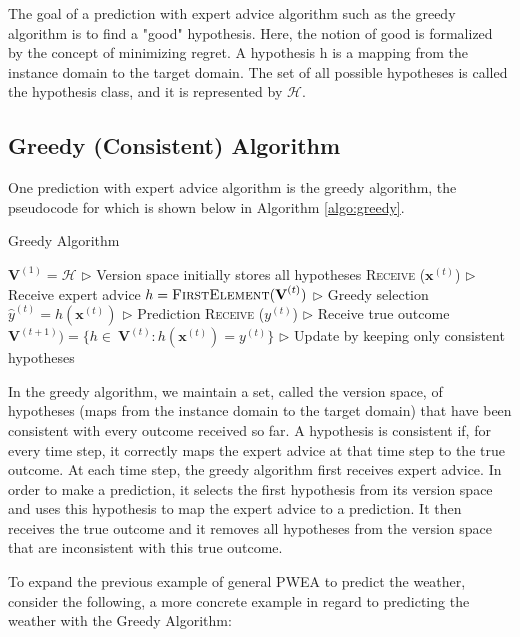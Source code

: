 \documentclass[11pt]{article}
\begin{document}
The goal of a prediction with expert advice algorithm such as the greedy algorithm is to find a "good" hypothesis. Here, the notion of good is formalized by the concept of minimizing regret. A hypothesis h is a mapping from the instance domain to the target domain. The set of all possible hypotheses is called the hypothesis class, and it is represented by $\mathcal{H}$.

\subsection{Greedy (Consistent) Algorithm }
\normalfont
One prediction with expert advice algorithm is the greedy algorithm, the pseudocode for which is shown below in Algorithm \ref{algo:greedy}. 

\begin{algorithm}[H]
\caption{Greedy Algorithm}
\label{algo:greedy}
\begin{algorithmic}[1]
\STATE $\textbf{V}^{(1)} = \mathcal{H}$ \hfill $\triangleright$ Version space initially stores all hypotheses
\STATE \textsc{Receive} ($\textbf{x}^{(t)}$) \hfill $\triangleright$ Receive expert advice
\STATE $h = \textsc{FirstElement}(\textbf{V}^{(t)})$ \hfill $\triangleright$ Greedy selection
\STATE $\hat{y}^{(t)} = h(\textbf{x}^{(t)})$ \hfill $\triangleright$ Prediction
\STATE \textsc{Receive} ($y^{(t)}$) \hfill $\triangleright$ Receive true outcome
\STATE $\textbf{V}^{(t+1)}) = \{h \in\ \textbf{V}^{(t)} : h(\textbf{x}^{(t)}) = y^{(t)}\}$ \hfill $\triangleright$ Update by keeping only consistent hypotheses

\ENDFOR
\end{algorithmic}
\end{algorithm}

In the greedy algorithm, we maintain a set, called the version space, of hypotheses (maps from the instance domain to the target domain) that have been consistent with every outcome received so far. A hypothesis is consistent if, for every time step, it correctly maps the expert advice at that time step to the true outcome. At each time step, the greedy algorithm first receives expert advice. In order to make a prediction, it selects the first hypothesis from its version space and uses this hypothesis to map the expert advice to a prediction. It then receives the true outcome and it removes all hypotheses from the version space that are inconsistent with this true outcome. 

To expand the previous example of general PWEA to predict the weather, consider the following, a more concrete example in regard to predicting the weather with the Greedy Algorithm:
\end{document}
